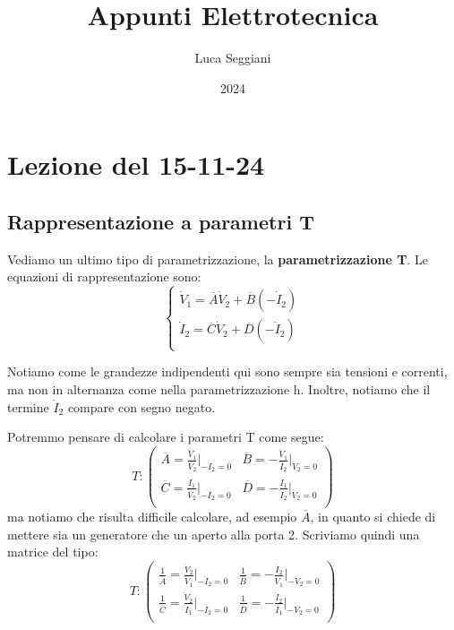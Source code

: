 \documentclass[a4paper,11pt]{article}
\title{Appunti Elettrotecnica}
\author{Luca Seggiani}
\date{2024}
\begin{document}
\section{Lezione del 15-11-24}

\thispagestyle{empty}
\pagestyle{fancy}

\subsection{Rappresentazione a parametri T}
Vediamo un ultimo tipo di parametrizzazione, la \textbf{parametrizzazione T}.
Le equazioni di rappresentazione sono:
\[
	\begin{cases}
		\dot{V}_1	= \overline{A} \dot{V}_2 + \overline{B} ( - \dot{I}_2 ) \\ 
		\dot{I}_2	= \overline{C} \dot{V}_2 + \overline{D} ( - \dot{I}_2 ) \\ 
	\end{cases}
\]

Notiamo come le grandezze indipendenti qui sono sempre sia tensioni e correnti, ma non in alternanza come nella parametrizzazione h.
Inoltre, notiamo che il termine $\dot{I}_2$ compare con segno negato.

Potremmo pensare di calcolare i parametri T come segue:
$$
T:
\begin{pmatrix}
	\overline{A} = \frac{\dot{V}_1}{\dot{V}_2} \Big|_{-\dot{I}_2 = 0}	& \overline{B} = -\frac{\dot{V}_1}{\dot{I}_2} \Big|_{\dot{V}_2 = 0} \\
	\overline{C} = \frac{\dot{I}_1}{\dot{V}_2} \Big|_{-\dot{I}_2 = 0}	& \overline{D} = -\frac{\dot{I}_1}{\dot{I}_2} \Big|_{\dot{V}_2 = 0} \\
\end{pmatrix}
$$
ma notiamo che risulta difficile calcolare, ad esempio $\overline{A}$, in quanto si chiede di mettere sia un generatore che un aperto alla porta 2. 
Scriviamo quindi una matrice del tipo:
$$
T:
\begin{pmatrix}
	\frac{1}{\overline{A}} = \frac{\dot{V}_2}{\dot{V}_1} \Big|_{- \dot{I}_2 = 0} & \frac{1}{\overline{B}} = -\frac{\dot{I}_2}{\dot{V}_1} \Big|_{- \dot{V}_2 = 0} \\
	\frac{1}{\overline{C}} = \frac{\dot{V}_2}{\dot{I}_1} \Big|_{- \dot{I}_2 = 0} & \frac{1}{\overline{D}} = -\frac{\dot{I}_2}{\dot{I}_1} \Big|_{- \dot{V}_2 = 0} \\
\end{pmatrix}
$$
\end{document}

